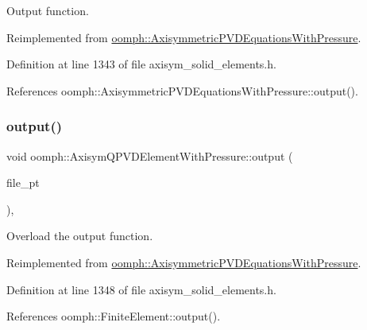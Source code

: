 Output function. 



Reimplemented from \hyperlink{classoomph_1_1AxisymmetricPVDEquationsWithPressure_a6916b3f7784015c263556565b2a7219d}{oomph\+::\+Axisymmetric\+P\+V\+D\+Equations\+With\+Pressure}.



Definition at line 1343 of file axisym\+\_\+solid\+\_\+elements.\+h.



References oomph\+::\+Axisymmetric\+P\+V\+D\+Equations\+With\+Pressure\+::output().

\mbox{\label{classoomph_1_1AxisymQPVDElementWithPressure_a8f09df5914ea8dbb6ba7041bd6be15bd}} 
\subsubsection{\texorpdfstring{output()}{output()}\hspace{0.1cm}{\footnotesize\ttfamily [3/4]}}
{\footnotesize\ttfamily void oomph\+::\+Axisym\+Q\+P\+V\+D\+Element\+With\+Pressure\+::output (\begin{DoxyParamCaption}\item[{F\+I\+LE $\ast$}]{file\+\_\+pt }\end{DoxyParamCaption})\hspace{0.3cm}{\ttfamily [inline]}, {\ttfamily [virtual]}}



Overload the output function. 



Reimplemented from \hyperlink{classoomph_1_1AxisymmetricPVDEquationsWithPressure_ad5018c9a6f9236f13c6df43df87336aa}{oomph\+::\+Axisymmetric\+P\+V\+D\+Equations\+With\+Pressure}.



Definition at line 1348 of file axisym\+\_\+solid\+\_\+elements.\+h.



References oomph\+::\+Finite\+Element\+::output().

\mbox{\label{classoomph_1_1AxisymQPVDElementWithPressure_a273e1cfc1185192fcb9cc3812360c87e}} 
